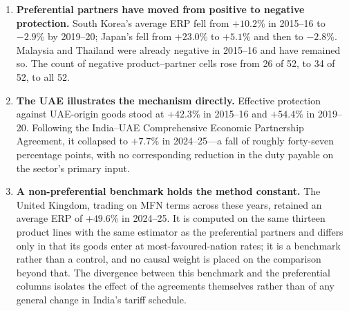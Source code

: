 \documentclass[11pt, a4paper]{article}
\numberwithin{figure}{section}
\numberwithin{table}{section}
\begin{document}
\begin{enumerate}
    \item \textbf{Preferential partners have moved from positive to negative protection.} South Korea's average ERP fell from $+10.2$\% in 2015--16 to $-2.9$\% by 2019--20; Japan's fell from $+23.0$\% to $+5.1$\% and then to $-2.8$\%. Malaysia and Thailand were already negative in 2015--16 and have remained so. The count of negative product--partner cells rose from 26 of 52, to 34 of 52, to all 52.
    \item \textbf{The UAE illustrates the mechanism directly.} Effective protection against UAE-origin goods stood at $+42.3$\% in 2015--16 and $+54.4$\% in 2019--20. Following the India--UAE Comprehensive Economic Partnership Agreement, it collapsed to $+7.7$\% in 2024--25---a fall of roughly forty-seven percentage points, with no corresponding reduction in the duty payable on the sector's primary input.
    \item \textbf{A non-preferential benchmark holds the method constant.} The United Kingdom, trading on MFN terms across these years, retained an average ERP of $+49.6$\% in 2024--25. It is computed on the same thirteen product lines with the same estimator as the preferential partners and differs only in that its goods enter at most-favoured-nation rates; it is a benchmark rather than a control, and no causal weight is placed on the comparison beyond that. The divergence between this benchmark and the preferential columns isolates the effect of the agreements themselves rather than of any general change in India's tariff schedule.
\end{enumerate}
\end{document}
